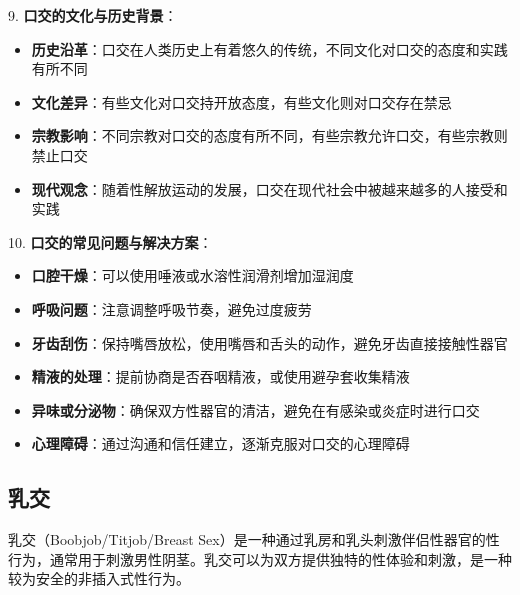 \documentclass[12pt,UTF8]{ctexbook}
\begin{document}
9. \textbf{口交的文化与历史背景}：
\begin{itemize}
	\item \textbf{历史沿革}：口交在人类历史上有着悠久的传统，不同文化对口交的态度和实践有所不同
	\item \textbf{文化差异}：有些文化对口交持开放态度，有些文化则对口交存在禁忌
	\item \textbf{宗教影响}：不同宗教对口交的态度有所不同，有些宗教允许口交，有些宗教则禁止口交
	\item \textbf{现代观念}：随着性解放运动的发展，口交在现代社会中被越来越多的人接受和实践
\end{itemize}

10. \textbf{口交的常见问题与解决方案}：
\begin{itemize}
	\item \textbf{口腔干燥}：可以使用唾液或水溶性润滑剂增加湿润度
	\item \textbf{呼吸问题}：注意调整呼吸节奏，避免过度疲劳
	\item \textbf{牙齿刮伤}：保持嘴唇放松，使用嘴唇和舌头的动作，避免牙齿直接接触性器官
	\item \textbf{精液的处理}：提前协商是否吞咽精液，或使用避孕套收集精液
	\item \textbf{异味或分泌物}：确保双方性器官的清洁，避免在有感染或炎症时进行口交
	\item \textbf{心理障碍}：通过沟通和信任建立，逐渐克服对口交的心理障碍
\end{itemize}


\subsection{乳交}

乳交（Boobjob/Titjob/Breast Sex）是一种通过乳房和乳头刺激伴侣性器官的性行为，通常用于刺激男性阴茎。乳交可以为双方提供独特的性体验和刺激，是一种较为安全的非插入式性行为。
\end{document}
